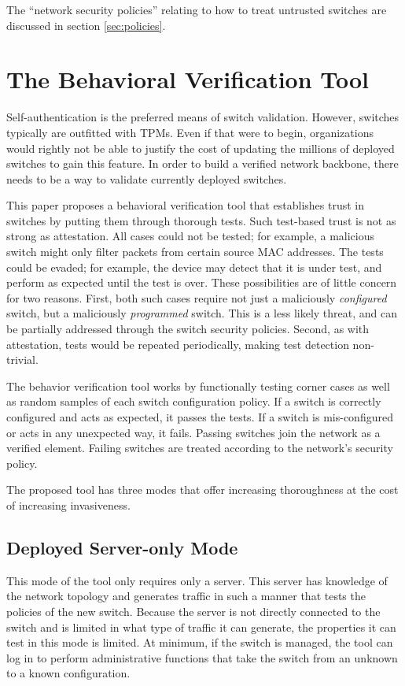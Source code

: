 \documentclass[journal]{IEEEtran}
\begin{document}
The ``network security policies'' relating to how to treat untrusted switches are discussed in
section \ref{sec:policies}.



\section{The Behavioral Verification Tool}
Self-authentication is the preferred means of switch validation. However, switches typically are
outfitted with TPMs. Even if that were to begin, organizations would rightly not be able to justify
the cost of updating the millions of deployed switches to gain this feature. In order to build a
verified network backbone, there needs to be a way to validate currently deployed switches.

This paper proposes a behavioral verification tool that establishes trust in switches by putting
them through thorough tests. Such test-based trust is not as strong as attestation. All cases could
not be tested; for example, a malicious switch might only filter packets from certain source MAC
addresses. The tests could be evaded; for example, the device may detect that it is under test, and
perform as expected until the test is over. These possibilities are of little concern for two
reasons. First, both such cases require not just a maliciously \textit{configured} switch, but a
maliciously \textit{programmed} switch. This is a less likely threat, and can be partially
addressed through the switch security policies. Second, as with attestation, tests would be
repeated periodically, making test detection non-trivial.

The behavior verification tool works by functionally testing corner cases as well as random samples
of each switch configuration policy. If a switch is correctly configured and acts as expected, it
passes the tests. If a switch is mis-configured or acts in any unexpected way, it fails. Passing
switches join the network as a verified element. Failing switches are treated according to the
network's security policy.

The proposed tool has three modes that offer increasing thoroughness at the cost of increasing
invasiveness.

\subsection{Deployed Server-only Mode}
This mode of the tool only requires only a server. This server has knowledge of
the network topology and generates traffic in such a manner that tests the policies of the new
switch. Because the server is not directly connected to the switch and is limited in what type of
traffic it can generate, the properties it can test in this mode is limited. At minimum, if the
switch is managed, the tool can log in to perform administrative functions that take the switch
from an unknown to a known configuration.
\end{document}
